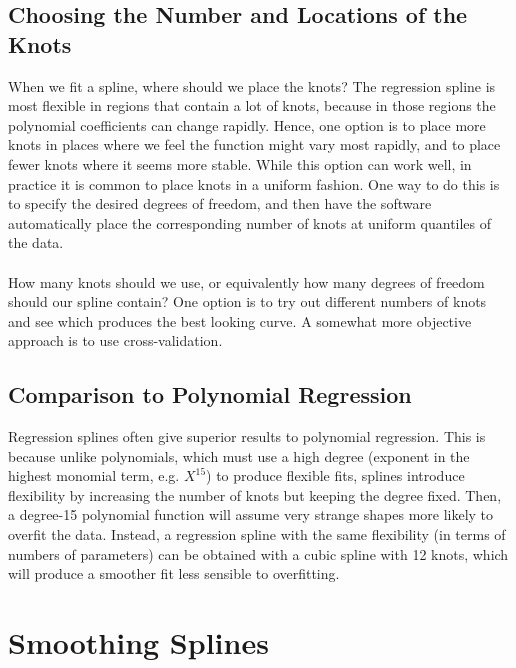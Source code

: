 \subsection{Choosing the Number and Locations of the Knots}
When we fit a spline, where should we place the knots? The regression spline is most flexible in regions that contain a lot of knots, because in those regions the polynomial coefficients can change rapidly. Hence, one option is to place more knots in places where we feel the function might vary most rapidly, and to place fewer knots where it seems more stable. While this option can work well, in practice it is common to place knots in a uniform fashion. One way to do this is to specify the desired degrees of freedom, and then have the software automatically place the corresponding number of knots at uniform quantiles of the data.\\\\
How many knots should we use, or equivalently how many degrees of freedom should our spline contain? One option is to try out different numbers of knots and see which produces the best looking curve. A somewhat more objective approach is to use cross-validation.

\subsection{Comparison to Polynomial Regression}
Regression splines often give superior results to polynomial regression. This
is because unlike polynomials, which must use a high degree (exponent in
the highest monomial term, e.g. $X^{15}$) to produce flexible fits, splines introduce flexibility by increasing the number of knots but keeping the degree
fixed. Then, a degree-15 polynomial function will assume very strange shapes more likely to overfit the data. Instead, a regression spline with the same flexibility (in terms of numbers of parameters) can be obtained with a cubic spline with 12 knots, which will produce a smoother fit less sensible to overfitting.

\section{Smoothing Splines}
